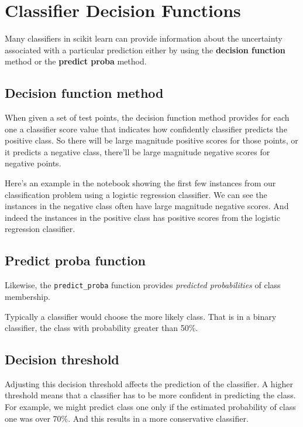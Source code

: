\section{Classifier Decision Functions}
\begin{multicols}{2}

Many classifiers in scikit learn can provide information about the uncertainty associated with a particular prediction either by using the \textbf{decision function} method or the \textbf{predict proba} method. 

\subsection{Decision function method}

When given a set of test points, the decision function method provides for each one a classifier score value that indicates how confidently classifier predicts the positive class. So there will be large magnitude positive scores for those points, or it predicts a negative class, there'll be large magnitude negative scores for negative points. 

Here's an example in the notebook showing the first few instances from our classification problem using a logistic regression classifier. We can see the instances in the negative class often have large magnitude negative scores. And indeed the instances in the positive class has positive scores from the logistic regression classifier. 

\subsection{Predict proba function}

Likewise, the \texttt{predict_proba} function provides \emph{predicted probabilities} of class membership. 

Typically a classifier would choose the more likely class. That is in a binary classifier, the class with probability greater than 50\%. 

\subsection{Decision threshold}

Adjusting this decision threshold affects the prediction of the classifier. A higher threshold means that a classifier has to be more confident in predicting the class. For example, we might predict class one only if the estimated probability of class one was over 70\%. And this results in a more conservative classifier. 


\end{multicols}
